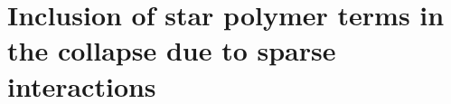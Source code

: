 \documentclass[
preprint,
a4paper,
12pt,
superscriptaddress,
pre]{revtex4}
\begin{document}




  


%

\section{Inclusion of star polymer terms in the collapse due to sparse
interactions}
\end{document}
